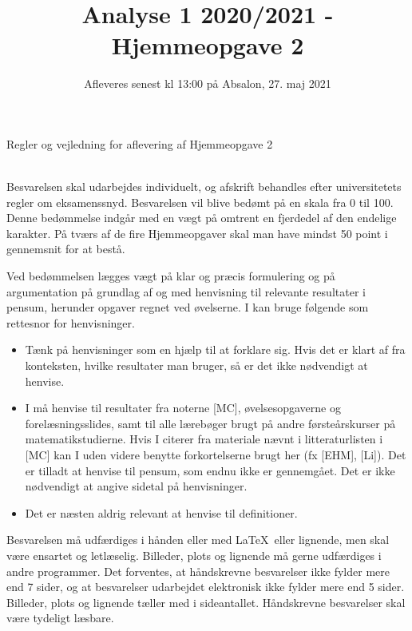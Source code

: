 \documentclass{article}
\title{Analyse 1 2020/2021 - Hjemmeopgave 2}
\author{}
\date{\vspace{-1cm}Afleveres senest kl 13:00 på Absalon, 27. maj 2021}
\begin{document}
	
	\maketitle
	
	\noindent
	
	
	
	
	\newpage
	\noindent
	{\LARGE Regler og vejledning for aflevering af Hjemmeopgave 2}
	
	\noindent\hrulefill \\
	
	\noindent
	Besvarelsen skal udarbejdes individuelt, og afskrift behandles efter universitetets regler om eksamenssnyd. Besvarelsen vil blive bedømt på en skala fra 0 til 100. Denne bedømmelse indgår med en vægt på omtrent en fjerdedel af den endelige karakter. På tværs af de fire Hjemmeopgaver skal man have mindst 50 point i gennemsnit for at bestå.
	
	Ved bedømmelsen lægges vægt på klar og præcis formulering og på argumentation på grundlag af og med henvisning til relevante resultater i pensum, herunder opgaver regnet ved øvelserne. I kan bruge følgende som rettesnor for henvisninger.
	\begin{itemize}
		\item Tænk på henvisninger som en hjælp til at forklare sig. Hvis det er klart af fra konteksten, hvilke resultater man bruger, så er det ikke nødvendigt at henvise.
		
		\item I må henvise til resultater fra noterne [MC], øvelsesopgaverne og forelæsningsslides, samt til alle l\ae{}reb\o{}ger brugt p\aa{} andre f\o{}rste\aa{}rskurser p\aa{} matematikstudierne. Hvis I citerer fra materiale n\ae{}vnt i litteraturlisten i [MC] kan I uden videre benytte forkortelserne brugt her (fx [EHM], [Li]). Det er tilladt at henvise til pensum, som endnu ikke er gennemgået. Det er ikke nødvendigt at angive sidetal på henvisninger. 
		
		\item Det er næsten aldrig relevant at henvise til definitioner.
	\end{itemize}
	
	\bigskip  
	\noindent
	Besvarelsen må udfærdiges i hånden eller med \LaTeX\ eller lignende, men skal være ensartet og letlæselig. Billeder, plots og lignende må gerne udfærdiges i andre programmer. Det forventes, at håndskrevne besvarelser ikke fylder mere end 7 sider,
	og at besvarelser udarbejdet elektronisk ikke fylder mere end 5 sider. Billeder, plots og lignende tæller med i sideantallet. Håndskrevne besvarelser skal være tydeligt læsbare.
	
\end{document}
